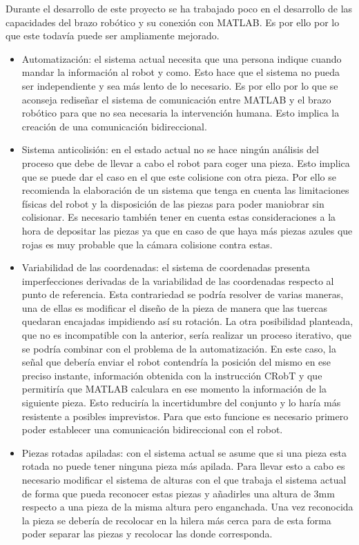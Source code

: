 Durante el desarrollo de este proyecto se ha trabajado poco en el desarrollo de las capacidades del brazo robótico y su conexión con MATLAB. Es por ello por lo que este todavía puede ser ampliamente mejorado.
\begin{itemize}
\item Automatización: el sistema actual necesita que una persona indique cuando mandar la información al robot y como. Esto hace que el sistema no pueda ser independiente y sea más lento de lo necesario. Es por ello por lo que se aconseja rediseñar el sistema de comunicación entre MATLAB y el brazo robótico para que no sea necesaria la intervención humana. Esto implica la creación de una comunicación bidireccional.
\item Sistema anticolisión: en el estado actual no se hace ningún análisis del proceso que debe de llevar a cabo el robot para coger una pieza. Esto implica que se puede dar el caso en el que este colisione con otra pieza. Por ello se recomienda la elaboración de un sistema que tenga en cuenta las limitaciones físicas del robot y la disposición de las piezas para poder maniobrar sin colisionar. Es necesario también tener en cuenta estas consideraciones a la hora de depositar las piezas ya que en caso de que haya más piezas azules que rojas es muy probable que la cámara colisione contra estas.
\item Variabilidad de las coordenadas: el sistema de coordenadas presenta imperfecciones derivadas de la variabilidad de las coordenadas respecto al punto de referencia. Esta contrariedad se podría resolver de varias maneras, una de ellas es modificar el diseño de la pieza de manera que las tuercas quedaran encajadas impidiendo así su rotación. La otra posibilidad planteada, que no es incompatible con la anterior, sería realizar un proceso iterativo, que se podría combinar con el problema de la automatización. En este caso, la señal que debería enviar el robot contendría la posición del mismo en ese preciso instante, información obtenida con la instrucción CRobT y que permitiría que MATLAB calculara en ese momento la información de la siguiente pieza. Esto reduciría la incertidumbre del conjunto y lo haría más resistente a posibles imprevistos. Para que esto funcione es necesario primero poder establecer una comunicación bidireccional con el robot.
\item Piezas rotadas apiladas: con el sistema actual se asume que si una pieza esta rotada no puede tener ninguna pieza más apilada. Para llevar esto a cabo es necesario modificar el sistema de alturas con el que trabaja el sistema actual de forma que pueda reconocer estas piezas y añadirles una altura de 3mm respecto a una pieza de la misma altura pero enganchada. Una vez reconocida la pieza se debería de recolocar en la hilera más cerca para de esta forma poder separar las piezas y recolocar las donde corresponda.
\end{itemize}

